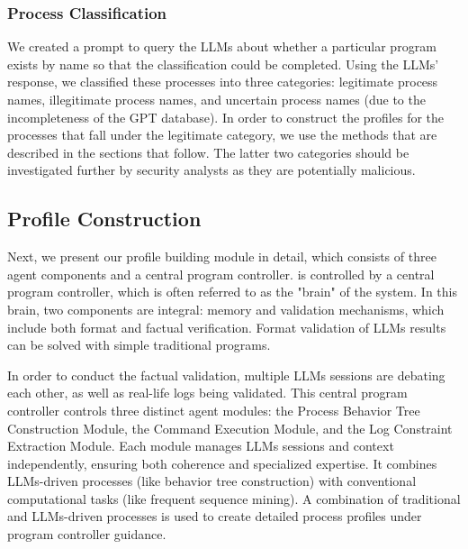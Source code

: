 \subsubsection{Process Classification}
\label{sec:classifition}
We created a prompt to query the LLMs about whether a particular program exists by name so that the classification could be completed. Using the LLMs' response, we classified these processes into three categories: legitimate process names, illegitimate process names, and uncertain process names (due to the incompleteness of the GPT database). In order to construct the profiles for the processes that fall under the legitimate category, we use the methods that are described in the sections that follow. The latter two categories should be investigated further by security analysts as they are potentially malicious.

\subsection{Profile Construction}
\label{sec:profile_con}
Next, we present our profile building module in detail, which consists of three agent components and a central program controller.
\tool is controlled by a central program controller, which is often referred to as the "brain" of the system. In this brain, two components are integral: memory and validation mechanisms, which include both format and factual verification. 
Format validation of LLMs results can be solved with simple traditional programs.

In order to conduct the factual validation, multiple LLMs sessions are debating each other, as well as real-life logs being validated.
This central program controller controls three distinct agent modules: the Process Behavior Tree Construction Module, the Command Execution Module, and the Log Constraint Extraction Module. Each module manages LLMs sessions and context independently, ensuring both coherence and specialized expertise. It combines LLMs-driven processes (like behavior tree construction) with conventional computational tasks (like frequent sequence mining). A combination of traditional and LLMs-driven processes is used to create detailed process profiles under program controller guidance.

